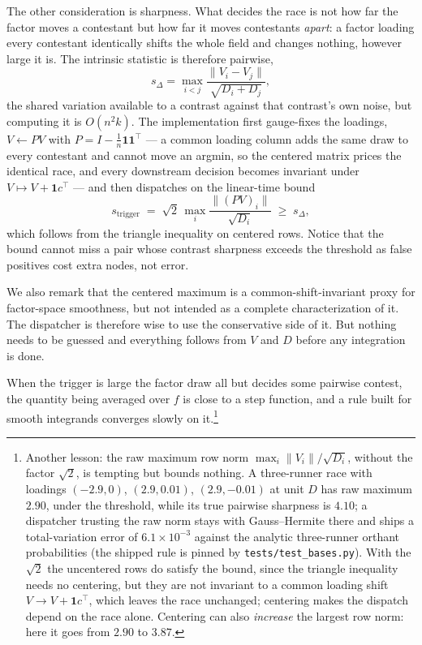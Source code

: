 \documentclass[11pt]{article}
\begin{document}
The other consideration is sharpness. What decides the race is not how
far the factor moves a contestant but how far it moves contestants
\emph{apart}: a factor loading every contestant identically shifts the
whole field and changes nothing, however large it is. The intrinsic
statistic is therefore pairwise,
\[
s_{\Delta}=\max_{i<j}\frac{\lVert V_i-V_j\rVert}{\sqrt{D_i+D_j}},
\]
the shared variation available to a contrast against that contrast's own
noise, but computing it is $O(n^2 k)$. The implementation first
gauge-fixes the loadings, $V\leftarrow PV$ with
$P=I-\tfrac1n\mathbf{1}\mathbf{1}^{\top}$ --- a common loading column
adds the same draw to every contestant and cannot move an argmin, so the
centered matrix prices the identical race, and every downstream decision
becomes invariant under $V\mapsto V+\mathbf{1}c^{\top}$ --- and then
dispatches on the linear-time bound
\[
s_{\mathrm{trigger}}\;=\;\sqrt2\,
\max_i \frac{\lVert (PV)_i\rVert}{\sqrt{D_i}}\;\ge\;s_{\Delta},
\]
which follows from the triangle inequality on centered rows. Notice that the bound cannot miss a pair whose contrast sharpness exceeds the threshold as false positives cost extra nodes, not error.

We also remark that the centered maximum is a
common-shift-invariant proxy for factor-space smoothness, but not intended as a complete
characterization of it. The dispatcher is therefore wise to use the
conservative side of it. But nothing needs to be guessed and everything follows
from $V$ and $D$ before any integration is done.

When the trigger is large the factor draw all but decides some pairwise contest, the
quantity being averaged over $f$ is close to a step function, and a rule
built for smooth integrands converges slowly on it.\footnote{Another lesson: the raw
maximum row norm $\max_i\lVert V_i\rVert/\sqrt{D_i}$, without the factor
$\sqrt2$, is tempting but bounds nothing. A three-runner race with loadings
$(-2.9,0)$, $(2.9,0.01)$, $(2.9,-0.01)$ at unit $D$ has raw
maximum $2.90$, under the threshold, while its true pairwise sharpness
is $4.10$; a dispatcher trusting the raw norm stays with Gauss--Hermite
there and ships a total-variation error of $6.1\times10^{-3}$ against
the analytic three-runner orthant probabilities (the shipped rule is
pinned by \texttt{tests/test\_bases.py}). With the $\sqrt2$ the uncentered rows do
satisfy the bound, since the triangle inequality needs no centering, but
they are not invariant to a common loading shift $V\to V+\mathbf{1}c^{\top}$,
which leaves the race unchanged; centering makes the dispatch depend on
the race alone. Centering can also \emph{increase} the largest row norm:
here it goes from $2.90$ to $3.87$.}
\end{document}
